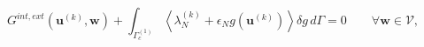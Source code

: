 \begin{equation}
 G^{int,ext} ( \boldsymbol u ^ {\left( k \right) }, \boldsymbol w ) + \int_{\Gamma_c^{\left( 1 \right) } } \left< \lambda_N^ {\left( k \right) } + \epsilon_N g( \boldsymbol u ^ {\left( k \right) } )  \right> \delta g  \, d\Gamma = 0 \qquad \forall \boldsymbol w \in \mathcal{V},
 \end{equation}

%
%
%
%
%
%
%
%
%
%
%
